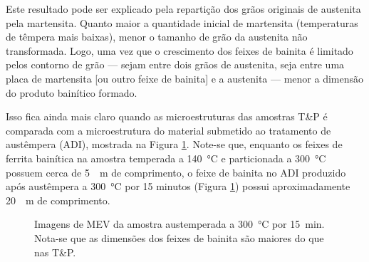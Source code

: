 Este resultado pode ser explicado pela repartição dos grãos originais de austenita pela martensita. Quanto maior a quantidade inicial de martensita (temperaturas de têmpera mais baixas), menor o tamanho de grão da austenita não transformada. Logo, uma vez que o crescimento dos feixes de bainita é limitado pelos contorno de grão --- sejam entre dois grãos de austenita, seja entre uma placa de martensita [ou outro feixe de bainita] e a austenita --- menor a dimensão do produto bainítico formado.

Isso fica ainda mais claro quando as microestruturas das amostras T\&P é comparada com a microestrutura do material submetido ao tratamento de austêmpera (ADI), mostrada na Figura \ref{fig:ADI300MEV}. Note-se que, enquanto os feixes de ferrita bainítica na amostra temperada a \SI{140}{\degreeCelsius} e particionada a \SI{300}{\degreeCelsius} possuem cerca de \SI{5}{\mu m} de comprimento, o feixe de bainita no ADI produzido após austêmpera a \SI{300}{\degreeCelsius} por 15 minutos (Figura \ref{fig:ADI300MEV}) possui aproximadamente \SI{20}{\mu m} de comprimento.

\begin{figure}
  \centering
  \quad
  \caption{Imagens de MEV da amostra austemperada a \SI{300}{\degreeCelsius} por 15~min. Nota-se que as dimensões dos feixes de bainita são maiores do que nas T\&P.}
  \label{fig:ADI300MEV}
\end{figure}

